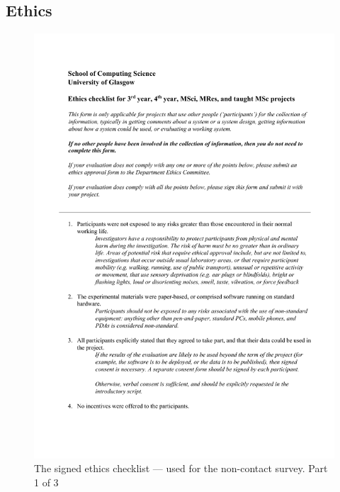 \documentclass{l4proj}
\begin{document}
%
% 

\begin{appendices}

    \chapter{Ethics}

    \begin{figure}[!htb]
        \centering
        \includegraphics[width=0.8\linewidth]{images/ethics_checklist_signed 1.pdf}

        \caption{ The signed ethics checklist — used for the non-contact survey. Part 1 of 3 }

        \label{fig:ethics_checklist1}
    \end{figure}


\end{appendices}
\end{document}

